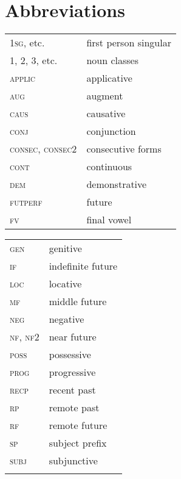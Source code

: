 \documentclass[output=paper]{langsci/langscibook}
\begin{document}
\section*{Abbreviations}
\begin{tabularx}{.45\textwidth}{lX}
\textsc{1sg}, etc. &  first person singular \\

1, 2, 3, etc. & noun classes \\

\textsc{applic} & applicative \\

\textsc{aug}  &  augment\\

\textsc{caus} &   causative \\

\textsc{conj}   &  conjunction \\

\textsc{consec, consec2} &  consecutive forms \\

\textsc{cont}  &  continuous \\

\textsc{dem}  &  demonstrative \\

\textsc{futperf} & future {\ \ \ \ \ \ \}  perfect \\

\textsc{fv}  &  final vowel \\
\end{tabularx}
\begin{tabularx}{.45\textwidth}{lX}
\textsc{gen}  &  genitive \\

\textsc{if}  &  indefinite future \\

\textsc{loc}  &  locative \\

\textsc{mf} &   middle future \\

\textsc{neg}  &  negative \\

\textsc{nf, nf2} & near future \\

\textsc{poss}  &  possessive \\

\textsc{prog}  &  progressive \\

\textsc{recp}  &  recent past \\

\textsc{rp}  &  remote past \\

\textsc{rf}  &  remote future \\

\textsc{sp}  &  subject prefix \\

\textsc{subj}   & subjunctive \\
& \\
\end{tabularx}
\end{document}
